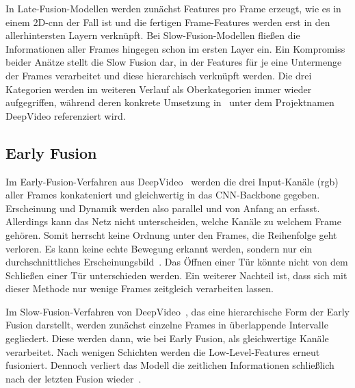 In Late-Fusion-Modellen werden zunächst Features pro Frame erzeugt, wie es in einem 2D-\gls{cnn} der Fall ist und die fertigen Frame-Features werden erst in den allerhintersten Layern verknüpft.
Bei Slow-Fusion-Modellen fließen die Informationen aller Frames hingegen schon im ersten Layer ein.
Ein Kompromiss beider Anätze stellt die Slow Fusion dar, in der Features für je eine Untermenge der Frames verarbeitet und diese hierarchisch verknüpft werden.
Die drei Kategorien werden im weiteren Verlauf als Oberkategorien immer wieder aufgegriffen, während deren konkrete Umsetzung in~\cite{Karpathy14} unter dem Projektnamen DeepVideo referenziert wird.



\subsection{Early Fusion}
\label{subsec:early-fusion}

Im Early-Fusion-Verfahren aus DeepVideo~\cite{Karpathy14} werden die drei Input-Kanäle (\gls{rgb}) aller Frames konkateniert und gleichwertig in das CNN-Backbone gegeben.
Erscheinung und Dynamik werden also parallel und von Anfang an erfasst.
Allerdings kann das Netz nicht unterscheiden, welche Kanäle zu welchem Frame gehören.
Somit herrscht keine Ordnung unter den Frames, \dh die Reihenfolge geht verloren.
Es kann keine echte Bewegung erkannt werden, sondern nur ein durchschnittliches Erscheinungsbild~\cite{Tran15}.
Das Öffnen einer Tür könnte \zB nicht von dem Schließen einer Tür unterschieden werden.
Ein weiterer Nachteil ist, dass sich mit dieser Methode nur wenige Frames zeitgleich verarbeiten lassen.

Im Slow-Fusion-Verfahren von DeepVideo~\cite{Karpathy14}, das eine hierarchische Form der Early Fusion darstellt, werden zunächst einzelne Frames in überlappende Intervalle gegliedert.
Diese werden dann, wie bei Early Fusion, als gleichwertige Kanäle verarbeitet.
Nach wenigen Schichten werden die Low-Level-Features erneut fusioniert.
Dennoch verliert das Modell die zeitlichen Informationen schließlich nach der letzten Fusion wieder~\cite{Tran15}.

